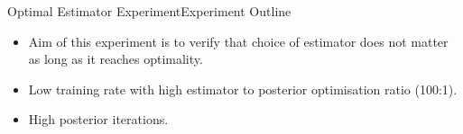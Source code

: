 \documentclass{beamer}
\begin{document}
\begin{frame}{Optimal Estimator Experiment}{Experiment Outline}
\begin{itemize}
\item Aim of this experiment is to verify that choice of estimator does not matter as long as it reaches optimality.
\item Low training rate with high estimator to posterior optimisation ratio (100:1).
\item High posterior iterations.
\end{itemize}
\begin{figure}[h]
\end{figure}
\end{frame}
\end{document}
